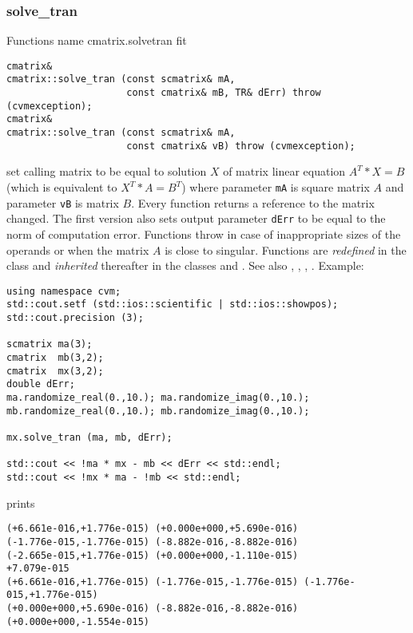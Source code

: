 \subsubsection{solve\_tran}
Functions%
\pdfdest name {cmatrix.solvetran} fit
\begin{verbatim}
cmatrix&
cmatrix::solve_tran (const scmatrix& mA,
                     const cmatrix& mB, TR& dErr) throw (cvmexception);
cmatrix&
cmatrix::solve_tran (const scmatrix& mA,
                     const cmatrix& vB) throw (cvmexception);
\end{verbatim}
set calling matrix to be equal to  solution $X$ of 
matrix linear equation
$A^T*X=B$ (which is equivalent to $X^T*A=B^T$)
where parameter \verb"mA" is square matrix $A$
and parameter \verb"vB" is matrix $B$.
Every function returns a reference to the matrix changed.
The first version also sets  output parameter \verb"dErr" to be equal
to the norm of computation error.
Functions throw 
in case of inappropriate sizes
of the operands or when the matrix $A$ is close to singular.
Functions are \emph{redefined} in  the class
 and
\emph{inherited} thereafter in the classes
 and
.
See also
,
,
,
.
Example:
\begin{Verbatim}
using namespace cvm;
std::cout.setf (std::ios::scientific | std::ios::showpos); 
std::cout.precision (3);

scmatrix ma(3);
cmatrix  mb(3,2);
cmatrix  mx(3,2);
double dErr;
ma.randomize_real(0.,10.); ma.randomize_imag(0.,10.);
mb.randomize_real(0.,10.); mb.randomize_imag(0.,10.);

mx.solve_tran (ma, mb, dErr);

std::cout << !ma * mx - mb << dErr << std::endl;
std::cout << !mx * ma - !mb << std::endl;
\end{Verbatim}
prints
\begin{Verbatim}
(+6.661e-016,+1.776e-015) (+0.000e+000,+5.690e-016)
(-1.776e-015,-1.776e-015) (-8.882e-016,-8.882e-016)
(-2.665e-015,+1.776e-015) (+0.000e+000,-1.110e-015)
+7.079e-015
(+6.661e-016,+1.776e-015) (-1.776e-015,-1.776e-015) (-1.776e-015,+1.776e-015)
(+0.000e+000,+5.690e-016) (-8.882e-016,-8.882e-016) (+0.000e+000,-1.554e-015)
\end{Verbatim}
\newpage





